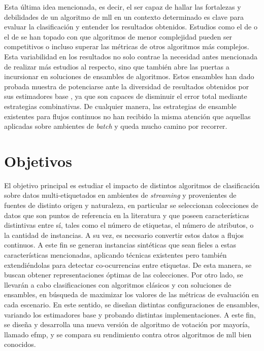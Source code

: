 Esta última idea mencionada, es decir, el ser capaz de hallar las fortalezas y
debilidades de un algoritmo de \acrshort{mll} en un contexto determinado es
clave para evaluar la clasificación y entender los resultados obtenidos.
Estudios como el de \citeauthor{sousa_multi-label_2018}
\cite{sousa_multi-label_2018} o el de \citeauthor{read_scalable_2012}
\cite{read_scalable_2012} se han topado con que algoritmos de menor complejidad
pueden ser competitivos o incluso superar las métricas de otros algoritmos más
complejos. Esta variabilidad en los resultados no solo contrae la necesidad
antes mencionada de realizar más estudios al respecto, sino que también abre las
puertas a incursionar en soluciones de ensambles de algoritmos. Estos ensambles
han dado probada muestra de potenciarse ante la diversidad de resultados
obtenidos por sus estimadores base \cite{polikar_polikar_2006}, ya que son
capaces de disminuir el error total mediante estrategias combinativas. De
cualquier manera, las estrategias de ensamble existentes para flujos continuos
no han recibido la misma atención que aquellas aplicadas sobre ambientes de
\textit{batch} y queda mucho camino por recorrer.



\section{Objetivos}
\label{intro_objetivos}

El objetivo principal es estudiar el impacto de distintos algoritmos de
clasificación sobre datos multi-etiquetados en ambientes de \textit{streaming} y
provenientes de fuentes de distinto origen y naturaleza, en particular se
seleccionan colecciones de datos que son puntos de referencia en la literatura y
que poseen características distintivas entre sí, tales como el número de
etiquetas, el número de atributos, o la cantidad de instancias. A su vez, es
necesario convertir estos datos a flujos continuos. A este fin se generan
instancias sintéticas que sean fieles a estas características mencionadas,
aplicando técnicas existentes pero también extendiéndolas para detectar
co-ocurrencias entre etiquetas. De esta manera, se buscan obtener
representaciones óptimas de las colecciones. Por otro lado, se llevarán a cabo
clasificaciones con algoritmos clásicos y con soluciones de ensambles, en
búsqueda de maximizar los valores de las métricas de evaluación en cada
escenario. En este sentido, se diseñan distintas configuraciones de ensambles,
variando los estimadores base y probando distintas implementaciones. A este fin,
se diseña y desarrolla una nueva versión de algoritmo de votación por mayoría,
llamado \acrshort{efmp}, y se compara su rendimiento contra otros algoritmos de
\acrshort{mll} bien conocidos.

